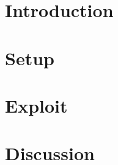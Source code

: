 \documentclass[12pt,twocolumn]{article}
\begin{document}

\onecolumn
\tableofcontents
\newpage

\twocolumn
\section{Introduction}

\section{Setup}

\section{Exploit}

\section{Discussion}

\onecolumn
\printbibliography
\end{document}
